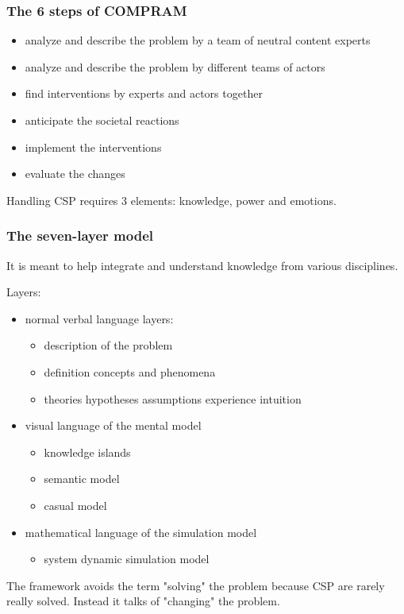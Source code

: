 \subsubsection{The 6 steps of COMPRAM}

\begin{itemize}
	\item analyze and describe the problem by a team of neutral content
	experts
	\item analyze and describe the problem by different teams of actors
	\item find interventions by experts and actors together
	\item anticipate the societal reactions
	\item implement the interventions
	\item evaluate the changes
\end{itemize}

Handling CSP requires 3 elements: knowledge, power and emotions.

\subsubsection{The seven-layer model}

It is meant to help integrate and understand knowledge from various
disciplines.

Layers:

\begin{itemize}
	\item normal verbal language layers:
	\begin{itemize}
		\item description of the problem
		\item definition concepts and phenomena
		\item theories hypotheses assumptions experience intuition
	\end{itemize}
	\item visual language of the mental model
	\begin{itemize}
		\item knowledge islands
		\item semantic model
		\item casual model
	\end{itemize}
	\item mathematical language of the simulation model
	\begin{itemize}
		\item system dynamic simulation model
	\end{itemize}
\end{itemize}

The framework avoids the term "solving" the problem because CSP are rarely
really solved. Instead it talks of "changing" the problem.
